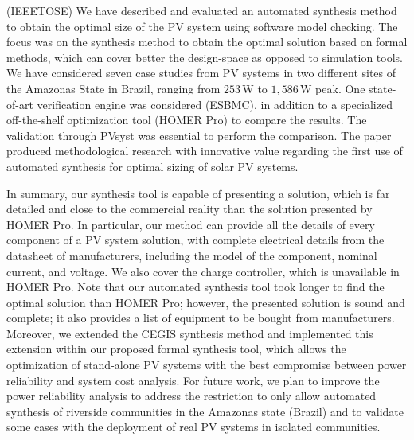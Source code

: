 \documentclass[10pt,journal,compsoc]{IEEEtran}
\begin{document}
(IEEETOSE) We have described and evaluated an automated synthesis method to obtain the optimal size of the PV system using software model checking. The focus was on the synthesis method to obtain the optimal solution based on formal methods, which can cover better the design-space as opposed to simulation tools. We have considered seven case studies from PV systems in two different sites of the Amazonas State in Brazil, ranging from $253$\,W to $1,586$\,W peak. One state-of-art verification engine was considered (ESBMC), in addition to a specialized off-the-shelf optimization tool (HOMER Pro) to compare the results. The validation through PVsyst was essential to perform the comparison. The paper produced methodological research with innovative value regarding the first use of automated synthesis for optimal sizing of solar PV systems.

In summary, our synthesis tool is capable of presenting a solution, which is far detailed and close to the commercial reality than the solution presented by HOMER Pro. In particular, our method can provide all the details of every component of a PV system solution, with complete electrical details from the datasheet of manufacturers, including the model of the component, nominal current, and voltage. We also cover the charge controller, which is unavailable in HOMER Pro. Note that our automated synthesis tool took longer to find the optimal solution than HOMER Pro; however, the presented solution is sound and complete; it also provides a list of equipment to be bought from manufacturers. Moreover, we extended the CEGIS synthesis method and implemented this extension within our proposed formal synthesis tool, which allows the optimization of stand-alone PV systems with the best compromise between power reliability and system cost analysis. For future work, we plan to improve the power reliability analysis to address the restriction to only allow automated synthesis of riverside communities in the Amazonas state (Brazil) and to validate some cases with the deployment of real PV systems in isolated communities.


%
\end{document}
